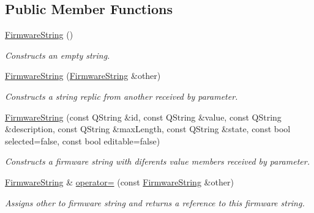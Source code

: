 \subsection*{Public Member Functions}
\begin{DoxyCompactItemize}
\item 
\mbox{\hyperlink{classFirmwareString_a624ab9d3c534ffd9c99665d2462e73ac}{Firmware\+String}} ()
\begin{DoxyCompactList}\small\item\em Constructs an empty string. \end{DoxyCompactList}\item 
\mbox{\hyperlink{classFirmwareString_a3439d83bad2ac371123d26560f4f3716}{Firmware\+String}} (\mbox{\hyperlink{classFirmwareString}{Firmware\+String}} \&other)
\begin{DoxyCompactList}\small\item\em Constructs a string replic from another received by parameter. \end{DoxyCompactList}\item 
\mbox{\hyperlink{classFirmwareString_a29f14882ef2a8274cebb7d153f0ea85b}{Firmware\+String}} (const Q\+String \&id, const Q\+String \&value, const Q\+String \&description, const Q\+String \&max\+Length, const Q\+String \&state, const bool selected=false, const bool editable=false)
\begin{DoxyCompactList}\small\item\em Constructs a firmware string with diferents value members received by parameter. \end{DoxyCompactList}\item 
\mbox{\hyperlink{classFirmwareString}{Firmware\+String}} \& \mbox{\hyperlink{classFirmwareString_aa2fe115e019e6362ca1fb151097ffe88}{operator=}} (const \mbox{\hyperlink{classFirmwareString}{Firmware\+String}} \&other)
\begin{DoxyCompactList}\small\item\em Assigns other to firmware string and returns a reference to this firmware string. \end{DoxyCompactList}\end{DoxyCompactItemize}
